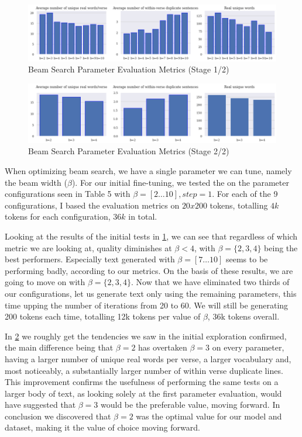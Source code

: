 \begin{figure}[ht!]
    \includegraphics[width=\textwidth, keepaspectratio=true]{figures/beam_param_eval_s1.png}
    \caption{Beam Search Parameter Evaluation Metrics (Stage 1/2)}
    \label{fig:beamparameval_s1}
\end{figure}

\begin{figure}[ht!]
    \includegraphics[width=\textwidth, keepaspectratio=true]{figures/beam_param_eval_s2.png}
    \caption{Beam Search Parameter Evaluation Metrics (Stage 2/2)}
    \label{fig:beamparameval_s2}
\end{figure}

When optimizing beam search, we have a single parameter we can tune, namely the beam width ($\beta$). For our initial fine-tuning, we tested the on the parameter configurations seen in Table 5 with $\beta=[2\dots10],step=1$. For each of the 9 configurations, I based the evaluation metrics on $20x200$ tokens, totalling $4k$ tokens for each configuration, $36k$ in total.

Looking at the results of the initial tests in \cref{fig:beamparameval_s1}, we can see that regardless of which metric we are looking at, quality diminishes at $\beta < 4$, with $\beta = \{2, 3, 4\}$ being the best performers. Especially text generated with $\beta = [7 \ldots 10]$ seems to be performing badly, according to our metrics. On the basis of these results, we are going to move on with $\beta = \{2, 3, 4\}$. Now that we have eliminated two thirds of our configurations, let us generate text only using the remaining parameters, this time upping the number of iterations from 20 to 60. We will still be generating 200 tokens each time, totalling 12k tokens per value of $\beta$, 36k tokens overall.

In \cref{fig:beamparameval_s2} we roughly get the tendencies we saw in the initial exploration confirmed, the main difference being that $\beta=2$ has overtaken $\beta=3$ on every parameter, having a larger number of unique real words per verse, a larger vocabulary and, most noticeably, a substantially larger  number of within verse duplicate lines. This improvement confirms the usefulness of performing the same tests on a larger body of text, as looking solely at the first parameter evaluation, would have suggested that $\beta=3$ would be the preferable value, moving forward. In conclusion we discovered that $\beta=2$ was the optimal value for our model and dataset, making it the value of choice moving forward.

